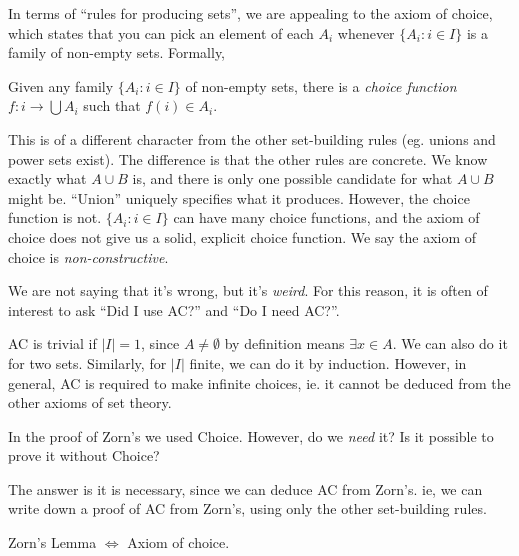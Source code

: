 \documentclass[a4paper]{article}
\begin{document}
In terms of ``rules for producing sets'', we are appealing to the axiom of choice, which states that you can pick an element of each $A_i$ whenever $\{A_i: i\in I\}$ is a family of non-empty sets. Formally,
\begin{axiom}
  Given any family $\{A_i: i\in I\}$ of non-empty sets, there is a \emph{choice function} $f: i \to \bigcup A_i$ such that $f(i)\in A_i$.
\end{axiom}
This is of a different character from the other set-building rules (eg. unions and power sets exist). The difference is that the other rules are concrete. We know exactly what $A\cup B$ is, and there is only one possible candidate for what $A\cup B$ might be. ``Union'' uniquely specifies what it produces. However, the choice function is not. $\{A_i:i\in I\}$ can have many choice functions, and the axiom of choice does not give us a solid, explicit choice function. We say the axiom of choice is \emph{non-constructive}.

We are not saying that it's wrong, but it's \emph{weird}. For this reason, it is often of interest to ask ``Did I use AC?'' and ``Do I need AC?''.

\note AC is trivial if $|I| = 1$, since $A\not=\emptyset$ by definition means $\exists x\in A$. We can also do it for two sets. Similarly, for $|I|$ finite, we can do it by induction. However, in general, AC is required to make infinite choices, ie. it cannot be deduced from the other axioms of set theory.

In the proof of Zorn's we used Choice. However, do we \emph{need} it? Is it possible to prove it without Choice?

The answer is it is necessary, since we can deduce AC from Zorn's. ie, we can write down a proof of AC from Zorn's, using only the other set-building rules.

\begin{thm}
  Zorn's Lemma $\Leftrightarrow$ Axiom of choice.
\end{thm}
\end{document}

